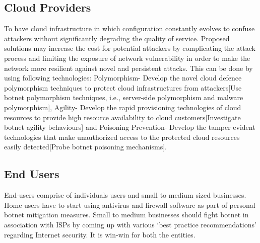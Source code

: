 \subsection{Cloud Providers}

To have cloud infrastructure in which configuration constantly evolves to confuse attackers without significantly degrading the quality of service. Proposed solutions may increase the cost for potential attackers by complicating the attack process and limiting the exposure of network vulnerability in order to make the network more resilient against novel and persistent attacks. This can be done by using following technologies: Polymorphism- Develop the novel cloud defence polymorphism techniques to protect cloud infrastructures from attackers[Use botnet polymorphism techniques, i.e., server-side polymorphism and malware polymorphism], Agility- Develop the rapid provisioning technologies of cloud resources to provide high resource availability to cloud customers[Investigate botnet agility behaviours] and Poisoning Prevention- Develop the tamper evident technologies that make unauthorized access to the protected cloud resources easily detected[Probe botnet poisoning mechanisms].

\subsection{End Users}

End-users comprise of individuals users and small to medium sized businesses. Home users have to start using antivirus and firewall software as part of personal botnet mitigation measures. Small to medium businesses should fight botnet in association with ISPs by coming up with various ‘best practice recommendations’ regarding Internet security. It is win-win for both the entities.


